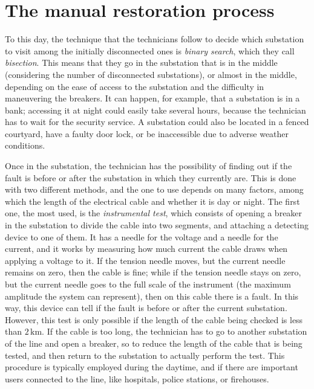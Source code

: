 \section{The manual restoration process}

To this day, the technique that the technicians follow to decide which substation to visit among the initially disconnected ones is \emph{binary search}, which they call \emph{bisection}. This means that they go in the substation that is in the middle (considering the number of disconnected substations), or almost in the middle, depending on the ease of access to the substation and the difficulty in maneuvering the breakers. It can happen, for example, that a substation is in a bank; accessing it at night could easily take several hours, because the technician has to wait for the security service. A substation could also be located in a fenced courtyard, have a faulty door lock, or be inaccessible due to adverse weather conditions.

Once in the substation, the technician has the possibility of finding out if the fault is before or after the substation in which they currently are. This is done with two different methods, and the one to use depends on many factors, among which the length of the electrical cable and whether it is day or night. The first one, the most used, is the \emph{instrumental test}, which consists of opening a breaker in the substation to divide the cable into two segments, and attaching a detecting device to one of them. It has a needle for the voltage and a needle for the current, and it works by measuring how much current the cable draws when applying a voltage to it. If the tension needle moves, but the current needle remains on zero, then the cable is fine; while if the tension needle stays on zero, but the current needle goes to the full scale of the instrument (the maximum amplitude the system can represent), then on this cable there is a fault. In this way, this device can tell if the fault is before or after the current substation. However, this test is only possible if the length of the cable being checked is less than $2 \, \mathrm{km}$. If the cable is too long, the technician has to go to another substation of the line and open a breaker, so to reduce the length of the cable that is being tested, and then return to the substation to actually perform the test. This procedure is typically employed during the daytime, and if there are important users connected to the line, like hospitals, police stations, or firehouses.

